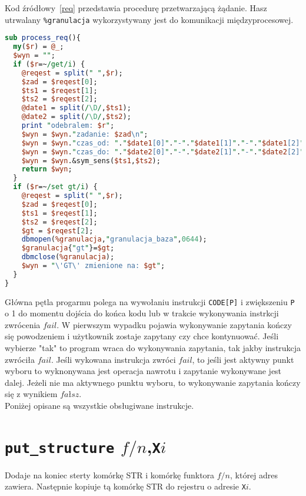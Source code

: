 {\color{dgray}
Kod źródłowy~\ref{req} przedstawia procedurę przetwarzającą żądanie. Hasz utrwalany \verb|%granulacja| wykorzystywany jest do komunikacji międzyprocesowej.
}

\begin{small}
\begin{lstlisting}[language=perl, frame=lines, caption=Przetwarzanie żądania - procedura \texttt{process\_req()}\label{req}., firstnumber=86]
sub process_req(){	
  my($r) = @_;
  $wyn = "";
  if ($r=~/get/i) {
	@reqest = split(" ",$r);
	$zad = $reqest[0];
	$ts1 = $reqest[1];
	$ts2 = $reqest[2];
	@date1 = split(/\D/,$ts1);
	@date2 = split(/\D/,$ts2);
	print "odebralem: $r"; 
	$wyn = $wyn."zadanie: $zad\n";
	$wyn = $wyn."czas_od: "."$date1[0]"."-"."$date1[1]"."-"."$date1[2]"."_"."$date1[3]".":"."$date1[4]".":"."$date1[5]"."\n";
	$wyn = $wyn."czas_do: "."$date2[0]"."-"."$date2[1]"."-"."$date2[2]"."_"."$date2[3]".":"."$date2[4]".":"."$date2[5]"."\n";		
	$wyn = $wyn.&sym_sens($ts1,$ts2);
	return $wyn;
  }
  if ($r=~/set gt/i) {
	@reqest = split(" ",$r);
	$zad = $reqest[0];
	$ts1 = $reqest[1];
	$ts2 = $reqest[2];
	$gt = $reqest[2];
	dbmopen(%granulacja,"granulacja_baza",0644);
	$granulacja{"gt"}=$gt;
	dbmclose(%granulacja);
	$wyn = "\'GT\' zmienione na: $gt";
  }		
}	
\end{lstlisting} 
\end{small}
\fi

Główna pętla progarmu polega na wywołaniu instrukcji \texttt{CODE[P]} i zwiększeniu \texttt{P} o 1 do momentu dojścia do końca kodu lub w trakcie wykonywania instrkcji zwrócenia $fail$. W pierwszym wypadku pojawia wykonywanie zapytania kończy się powodzeniem i użytkownik zostaje zapytany czy chce kontynuować. Jeśli wybierze "tak" to program wraca do wykonywania zapytania, tak jakby instrukcja zwróciła $fail$. Jeśli wykowana instrukcja zwróci $fail$, to jeśli jest aktywny punkt wyboru to wyknonywana jest operacja nawrotu i zapytanie wykonywane jest dalej. Jeżeli nie ma aktywnego punktu wyboru, to wykonywanie zapytania kończy się z wynikiem $fałsz$.\\
Poniżej opisane są wszystkie obsługiwane instrukcje.

\section{\texttt{put\_structure} $f/n$,\texttt{X}$i$}

Dodaje na koniec sterty komórkę STR i komórkę funktora $f/n$, której adres zawiera. Następnie kopiuje tą komórkę STR do rejestru o adresie \texttt{X}$i$.

